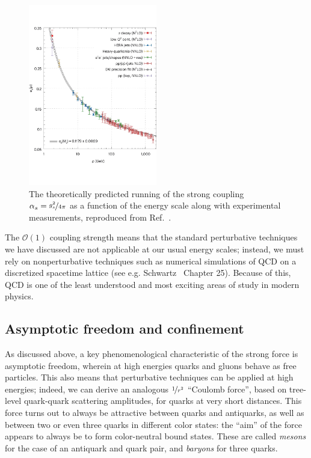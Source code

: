 \begin{figure}[ht]
	\centering
	\includegraphics[width=0.5\textwidth]{figures/01-SM-03-SM/qcd/qcd_running}
	\caption{The theoretically predicted running of the strong coupling $\alpha_s = \nicefrac{g_s^2}{4\pi}$ as a function of the energy scale along with experimental measurements, reproduced from Ref.~\cite{Boito:2023lzf}.}
	\label{fig:01_sm_qcd_running}
\end{figure}

The $\mathcal O(1)$ coupling strength means that the standard perturbative techniques we have discussed are not applicable at our usual energy scales; instead, we must rely on nonperturbative techniques such as numerical simulations of QCD on a discretized spacetime lattice (see e.g. Schwartz~\cite{Schwartz:2014sze} Chapter 25).
Because of this, QCD is one of the least understood and most exciting areas of study in modern physics.



\subsection{Asymptotic freedom and confinement}
\label{sec:01_sm_qcd_asymptotic}

As discussed above, a key phenomenological characteristic of the strong force is asymptotic freedom, wherein at high energies quarks and gluons behave as free particles.
This also means that perturbative techniques can be applied at high energies; indeed, we can derive an analogous $\nicefrac{1}{r^2}$ ``Coulomb force'', based on tree-level quark-quark scattering amplitudes, for quarks at very short distances.
This force turns out to always be attractive between quarks and antiquarks, as well as between two or even three quarks in different color states: the ``aim'' of the force appears to always be to form color-neutral bound states.
These are called \textit{mesons} for the case of an antiquark and quark pair, and \textit{baryons} for three quarks.

